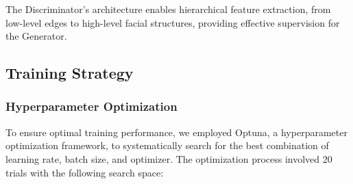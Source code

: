 \documentclass[a4paper, journal]{IEEEtran}
\begin{document}
The Discriminator's architecture enables hierarchical feature extraction, from low-level edges to high-level facial structures, providing effective supervision for the Generator.

\subsection{Training Strategy}

\subsubsection{Hyperparameter Optimization}
To ensure optimal training performance, we employed Optuna, a hyperparameter optimization framework, to systematically search for the best combination of learning rate, batch size, and optimizer. The optimization process involved 20 trials with the following search space:
\end{document}
